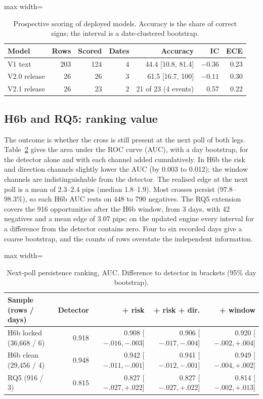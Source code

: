 \documentclass[conference]{IEEEtran}
\begin{document}
\begin{table}[t]\centering\footnotesize
\caption{Prospective scoring of deployed models. Accuracy is the share of correct signs; the interval
is a date-clustered bootstrap.}\label{tab:prosp}
\begin{adjustbox}{max width=\columnwidth}
\begin{tabular}{@{}lrrrrrr@{}}
\toprule
Model & Rows & Scored & Dates & Accuracy & IC & ECE\\
\midrule
V1 text & 203 & 124 & 4 & 44.4 [10.8, 81.4] & $-0.36$ & 0.23\\
V2.0 release & 26 & 26 & 3 & 61.5 [16.7, 100] & $-0.11$ & 0.30\\
V2.1 release & 26 & 23 & 2 & 21 of 23 (4 events) & 0.57 & 0.22\\
\bottomrule
\end{tabular}
\end{adjustbox}
\end{table}

\subsection{H6b and RQ5: ranking value}
The outcome is whether the cross is still present at the next poll of both legs. Table~\ref{tab:h6b}
gives the area under the ROC curve (AUC), with a day bootstrap, for the detector alone and with
each channel added cumulatively. In H6b the risk and direction channels slightly lower the AUC (by
0.003 to 0.012); the window channels are indistinguishable from the detector. The realised edge at
the next poll is a mean of 2.3--2.4 pips (median 1.8--1.9). Most crosses persist (97.8--98.3\%), so
each H6b AUC rests on 448 to 790 negatives. The RQ5 extension covers the 916 opportunities after
the H6b window, from 3 days, with 42 negatives and a mean edge of 3.07 pips; on the updated
engine every interval for a difference from the detector contains zero. Four to six recorded
days give a coarse bootstrap, and the counts of rows overstate the independent information.

\begin{table}[t]\centering\footnotesize
\caption{Next-poll persistence ranking, AUC. Difference to detector in brackets (95\% day
bootstrap).}\label{tab:h6b}
\begin{adjustbox}{max width=\columnwidth}
\begin{tabular}{@{}lrrrr@{}}
\toprule
Sample (rows / days) & Detector & + risk & + risk + dir. & + window\\
\midrule
H6b locked (36,668 / 6) & 0.918 & 0.908 [$-.016,-.003$] & 0.906 [$-.017,-.004$] & 0.920 [$-.002,+.004$]\\
H6b clean (29,456 / 4) & 0.948 & 0.942 [$-.011,-.001$] & 0.941 [$-.012,-.001$] & 0.949 [$-.004,+.002$]\\
RQ5 (916 / 3) & 0.815 & 0.827 [$-.027,+.022$] & 0.827 [$-.027,+.022$] & 0.814 [$-.002,+.013$]\\
\bottomrule
\end{tabular}
\end{adjustbox}
\end{table}
\end{document}
